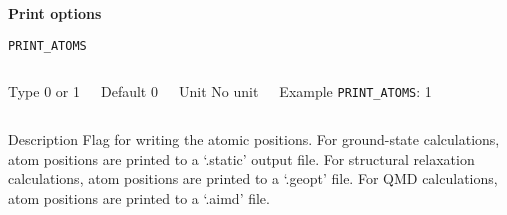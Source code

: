 \begin{frame}[allowframebreaks,c]{} \label{Print options}

\begin{center}
\Huge \textbf{Print options}
\end{center}

\end{frame}




\begin{frame}[allowframebreaks]{\texttt{PRINT\_ATOMS}} \label{PRINT_ATOMS}
\vspace*{-12pt}
\begin{columns}
\begin{block}{Type}
0 or 1
\end{block}

\begin{block}{Default}
0
\end{block}

\begin{block}{Unit}
No unit
\end{block}

\begin{block}{Example}
\texttt{PRINT\_ATOMS}: 1
\end{block}
\end{columns}

\begin{block}{Description}
Flag for writing the atomic positions. For ground-state calculations, atom positions are printed to a `.static' output file. For structural relaxation calculations, atom positions are printed to a `.geopt' file. For QMD calculations, atom positions are printed to a `.aimd' file.
\end{block}


\end{frame}




